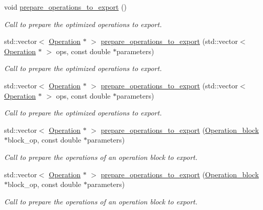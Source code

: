 \begin{DoxyCompactItemize}
void \hyperlink{class_decomposition___base_a965838902240670119c0ad68d087c322}{prepare\+\_\+operations\+\_\+to\+\_\+export} ()
\begin{DoxyCompactList}\small\item\em Call to prepare the optimized operations to export. \end{DoxyCompactList}\item 
std\+::vector$<$ \hyperlink{class_operation}{Operation} $\ast$ $>$ \hyperlink{class_decomposition___base_a68dcc2cdfa644cf8043021367cc07d28}{prepare\+\_\+operations\+\_\+to\+\_\+export} (std\+::vector$<$ \hyperlink{class_operation}{Operation} $\ast$ $>$ ops, const double $\ast$parameters)
\begin{DoxyCompactList}\small\item\em Call to prepare the optimized operations to export. \end{DoxyCompactList}\item 
std\+::vector$<$ \hyperlink{class_operation}{Operation} $\ast$ $>$ \hyperlink{class_decomposition___base_a3efce739eaf575d284156813436bb469}{prepare\+\_\+operations\+\_\+to\+\_\+export} (std\+::vector$<$ \hyperlink{class_operation}{Operation} $\ast$ $>$ ops, const double $\ast$parameters)
\begin{DoxyCompactList}\small\item\em Call to prepare the optimized operations to export. \end{DoxyCompactList}\item 
std\+::vector$<$ \hyperlink{class_operation}{Operation} $\ast$ $>$ \hyperlink{class_decomposition___base_a267addf036c4207905f7f443aea471bb}{prepare\+\_\+operations\+\_\+to\+\_\+export} (\hyperlink{class_operation__block}{Operation\+\_\+block} $\ast$block\+\_\+op, const double $\ast$parameters)
\begin{DoxyCompactList}\small\item\em Call to prepare the operations of an operation block to export. \end{DoxyCompactList}\item 
std\+::vector$<$ \hyperlink{class_operation}{Operation} $\ast$ $>$ \hyperlink{class_decomposition___base_a9d4cf31a7409fcc6a74d6ed927839f15}{prepare\+\_\+operations\+\_\+to\+\_\+export} (\hyperlink{class_operation__block}{Operation\+\_\+block} $\ast$block\+\_\+op, const double $\ast$parameters)
\begin{DoxyCompactList}\small\item\em Call to prepare the operations of an operation block to export. \end{DoxyCompactList}\item 

\end{DoxyCompactItemize}
